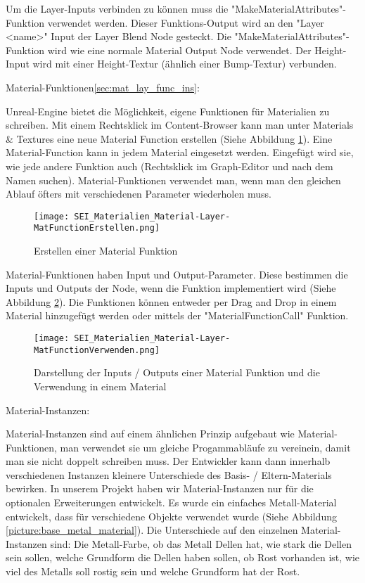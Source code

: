 Um die Layer-Inputs verbinden zu können muss die "MakeMaterialAttributes"-Funktion verwendet werden. Dieser
Funktions-Output wird an den "Layer <name>" Input der Layer Blend Node gesteckt. Die
"MakeMaterialAttributes"-Funktion wird wie eine normale Material Output Node verwendet. Der Height-Input wird mit einer
Height-Textur (ähnlich einer Bump-Textur) verbunden.

Material-Funktionen\ref{sec:mat_lay_func_ins}:

Unreal-Engine bietet die Möglichkeit, eigene Funktionen für Materialien zu schreiben. Mit einem Rechtsklick im
Content-Browser kann man unter Materials & Textures eine neue Material Function erstellen (Siehe
Abbildung \ref{picture:make_mat_func}). Eine Material-Function kann in jedem Material eingesetzt werden. Eingefügt wird sie, wie jede andere
Funktion auch (Rechtsklick im Graph-Editor und nach dem Namen suchen). Material-Funktionen verwendet man, wenn man
den gleichen Ablauf öfters mit verschiedenen Parameter wiederholen muss.

\begin{figure}[H]
    \centering
    \texttt{[image: SEI\_Materialien\_Material-Layer-MatFunctionErstellen.png]}
    \caption{Erstellen einer Material Funktion}
    \label{picture:make_mat_func}
\end{figure}

Material-Funktionen haben Input und Output-Parameter. Diese bestimmen die Inputs und Outputs der Node, wenn die
Funktion implementiert wird (Siehe Abbildung \ref{picture:use_mat_func}). Die Funktionen können entweder per Drag and
Drop in einem Material hinzugefügt werden oder mittels der "MaterialFunctionCall" Funktion.

\begin{figure}[H]
    \centering
    \texttt{[image: SEI\_Materialien\_Material-Layer-MatFunctionVerwenden.png]}
    \caption{Darstellung der Inputs / Outputs einer Material Funktion und die Verwendung in einem Material}
    \label{picture:use_mat_func}
\end{figure}

Material-Instanzen\citep{ue:mat_instances}:

Material-Instanzen sind auf einem ähnlichen Prinzip aufgebaut wie Material-Funktionen, man verwendet sie um gleiche
Progammabläufe zu vereinein, damit man sie nicht doppelt schreiben muss. Der Entwickler kann dann innerhalb
verschiedenen Instanzen kleinere Unterschiede des Basis- / Eltern-Materials bewirken. In unserem Projekt haben wir
Material-Instanzen nur für die optionalen Erweiterungen entwickelt. Es wurde ein einfaches Metall-Material entwickelt,
dass für verschiedene Objekte verwendet wurde (Siehe Abbildung \ref{picture:base_metal_material}). Die Unterschiede auf
den einzelnen Material-Instanzen sind: Die Metall-Farbe, ob das Metall Dellen hat, wie stark die Dellen sein sollen,
welche Grundform die Dellen haben sollen, ob Rost vorhanden ist, wie viel des Metalls soll rostig sein und welche
Grundform hat der Rost.

